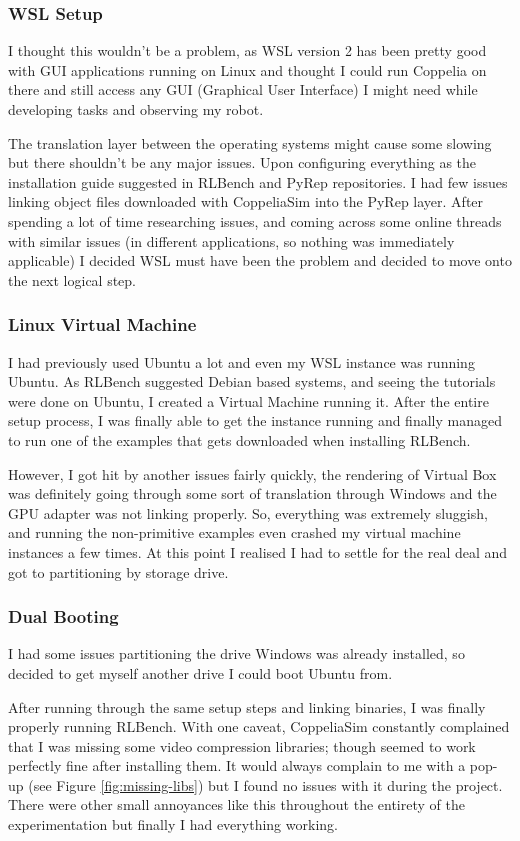 \subsubsection{WSL Setup}
I thought this wouldn't be a problem, as WSL version 2 has been pretty good with GUI applications running on Linux and thought I could run Coppelia on there and still access any GUI (Graphical User Interface) I might need while developing tasks and observing my robot.

The translation layer between the operating systems might cause some slowing but there shouldn't be any major issues. Upon configuring everything as the installation guide suggested in RLBench and PyRep repositories. I had few issues linking object files downloaded with CoppeliaSim into the PyRep layer. After spending a lot of time researching issues, and coming across some online threads with similar issues (in different applications, so nothing was immediately applicable) I decided WSL must have been the problem and decided to move onto the next logical step.
 
\subsubsection{Linux Virtual Machine}
I had previously used Ubuntu a lot and even my WSL instance was running Ubuntu. As RLBench suggested Debian based systems, and seeing the tutorials were done on Ubuntu, I created a Virtual Machine running it. After the entire setup process, I was finally able to get the instance running and finally managed to run one of the examples that gets downloaded when installing RLBench.

However, I got hit by another issues fairly quickly, the rendering of Virtual Box was definitely going through some sort of translation through Windows and the GPU adapter was not linking properly. So, everything was extremely sluggish, and running the non-primitive examples even crashed my virtual machine instances a few times. At this point I realised I had to settle for the real deal and got to partitioning by storage drive.

\subsubsection{Dual Booting}
I had some issues partitioning the drive Windows was already installed, so decided to get myself another drive I could boot Ubuntu from.

After running through the same setup steps and linking binaries, I was finally properly running RLBench. With one caveat, CoppeliaSim constantly complained that I was missing some video compression libraries; though seemed to work perfectly fine after installing them. It would always complain to me with a pop-up (see Figure \ref{fig:missing-libs}) but I found no issues with it during the project. There were other small annoyances like this throughout the entirety of the experimentation but finally I had everything working.

